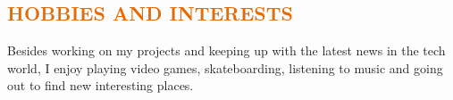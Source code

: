 \documentclass[a4paper, 20pt]{article}
\begin{document}
\begin{CJK*}{UTF8}{gbsn}
\vspace{5pt}
\section{\textcolor[HTML]{E36C09}{\textbf{HOBBIES AND INTERESTS}}}
\par{Besides working on my projects and keeping up with the latest news in the tech world, I enjoy playing video games, skateboarding, listening to music and going out to find new interesting places.}

\clearpage\end{CJK*}
\end{document}
